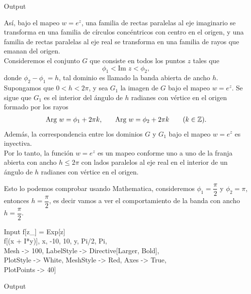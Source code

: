 \begin{mmaCell}[moregraphics={moreig={scale=0.5}}]{Output}
\end{mmaCell}
Así, bajo el mapeo $w = e^z$, una familia de rectas paralelas al eje imaginario se transforma en una familia de círculos concéntricos con centro en el origen, y una familia de rectas paralelas al eje real se transforma en una familia de rayos que emanan del origen.\\
Consideremos el conjunto $G$ que consiste en todos los puntos  $z$ tales que 
$$\phi_1<\mbox{Im }z<\phi_2,$$
donde $\phi_2-\phi_1=h$, tal dominio es llamado la banda  abierta de ancho $h$. Supongamos que $0<h<2\pi$, y sea $G_1$ la imagen de $G$ bajo el mapeo $w=e^z$. Se sigue que $G_1$ es el interior del ángulo de $h$ radianes con vértice en el origen formado por los rayos
\[
	\begin{array}{ccccc}
		\mbox{Arg }w=\phi_1+2\pi k,&&\mbox{Arg }w=\phi_2+2\pi k&&(k\in \mathbb{Z}).
	\end{array}
\]
Además, la correspondencia entre los dominios $G$ y $G_1$ bajo el mapeo $w=e^z$ es inyectiva.\\
Por lo tanto, la función $w=e^z$ es un mapeo conforme uno a uno de la franja abierta con ancho $h\leq 2\pi$ con lados paralelos al eje real en el interior de un ángulo de $h$ radianes con vértice en el origen.

\begin{Ejem}
	Esto lo podemos comprobar usando Mathematica, consideremos $\phi_1=\dfrac{\pi}{2}$ y $\phi_2=\pi$, entonces $h=\dfrac{\pi}{2}$, es decir vamos a ver el comportamiento de la banda con ancho $h=\dfrac{\pi}{2}$.
	\begin{mmaCell}{Input}
		f[z_] = Exp[z] \\f[(x + I*y)], {x, -10, 10}, {y, Pi/2, Pi},\\Mesh -> 100, LabelStyle -> Directive[Larger, Bold],\\PlotStyle -> White, MeshStyle -> Red, Axes -> True,\\PlotPoints -> 40]
	\end{mmaCell}
	
	\begin{mmaCell}[moregraphics={moreig={scale=0.5}}]{Output}
	\end{mmaCell}
\end{Ejem}

